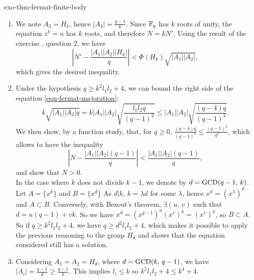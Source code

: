 \begin{correction}{exo-thm-fermat-finite-body}
\begin{enumerate}
\item We note $ A_3 = H_k $, hence $ | A_3 | = \frac{q-1}{k} $. Since $ \mathbb{F}_q $ has $ k $ roots of unity, the equation $ z^k = u $ has $ k $ roots, and therefore $ N = kN'$. Using the result of the exercise , question 2, we have
\begin{equation*}
\left| N'- \frac{| A_1 | | A_2 | | H_k |}{q} \right| <\Phi (H_k) \sqrt{| A_1 | | A_2 |},
\end{equation*}
which gives the desired inequality.
\item Under the hypothesis $ q \geq k^2 l_1 l_2 + 4 $, we can bound the right side of the equation \eqref{eqn-fermat-majoration}:
\begin{equation*}
k \sqrt{| A_1 | | A_2 | q} = k | A_1 | | A_2 | \sqrt{\frac{l_1 l_2 q}{(q-1)^2}} \leq | A_1 | | A_2 | \sqrt{\frac{(q-4) q}{(q-1)^2}}.
\end{equation*}
We then show, by a function study, that, for $ q \geq 0 $, $ \frac{(q-4) q}{(q-1)^2} \leq \frac{(q-1)^2}{q^2} $, which allows to have the inequality
\begin{equation*}
\left| N - \frac{| A_1 | | A_2 | (q-1)}{q} \right| <\frac{| A_1 | | A_2 | (q-1)}{q},
\end{equation*}
and show that $ N> 0 $. \\In the case where $ k $ does not divide $ k-1 $, we denote by $ d = \operatorname{GCD} (q-1, \, k) $. Let $ A = \{x^k\} $ and $ B = \{x^d\} $ As $ d | k $, $ k = \lambda d $ for some $ \lambda $, hence $ x^k = (x^\lambda)^d $ and $ A \subset B $. Conversely, with Bezout's theorem, $ \exists (u, \, v) $ such that $ d = u (q-1) + vk $. So we have $ x^d = (x^{q-1})^u (x^v)^k = (x^v)^k $, so $ B \subset A $. So if $ q \geq k^2 l_1 l_2 + 4 $, we have $ q \geq d^2 l_1 l_2 + 4 $, which makes it possible to apply the previous reasoning to the group $ H_d $ and shows that the equation considered still has a solution.
\item Considering $ A_1 = A_2 = H_d $, where $ d = \operatorname{GCD} (k, \, q-1) $, we have $ | A_i | = \frac{q-1}{d} \geq \frac{q-1}{k} $. This implies $ l_i \leq k $ so $ k^2 l_1 l_2 + 4 \leq k^4 + 4 $.
\end{enumerate}
\end{correction}
 
